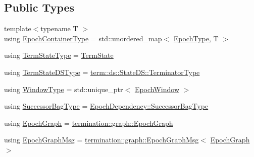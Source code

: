 \subsection*{Public Types}
\begin{DoxyCompactItemize}
\item 
{\footnotesize template$<$typename T $>$ }\\using \hyperlink{structvt_1_1term_1_1_termination_detector_a69e2615b61e072977463eea5b20b7933}{Epoch\+Container\+Type} = std\+::unordered\+\_\+map$<$ \hyperlink{namespacevt_a985a5adf291c34a3ca263b3378388236}{Epoch\+Type}, T $>$
\item 
using \hyperlink{structvt_1_1term_1_1_termination_detector_a0a47413bcb7bf5e10ecb31e7871a9268}{Term\+State\+Type} = \hyperlink{structvt_1_1term_1_1_term_state}{Term\+State}
\item 
using \hyperlink{structvt_1_1term_1_1_termination_detector_aa96c37b5c120063060c6418c48e64bd1}{Term\+State\+D\+S\+Type} = \hyperlink{structvt_1_1term_1_1ds_1_1_state_d_s_af98cfe31c25f710273ee103026d538e4}{term\+::ds\+::\+State\+D\+S\+::\+Terminator\+Type}
\item 
using \hyperlink{structvt_1_1term_1_1_termination_detector_a2c002273d9304c3cf72be85dd7d3ce52}{Window\+Type} = std\+::unique\+\_\+ptr$<$ \hyperlink{structvt_1_1term_1_1_epoch_window}{Epoch\+Window} $>$
\item 
using \hyperlink{structvt_1_1term_1_1_termination_detector_ac8df9c8a604ee2073ce195a994aaf252}{Successor\+Bag\+Type} = \hyperlink{structvt_1_1term_1_1_epoch_dependency_a3f00b47c33158f3241ebbeb0a0cb7b1d}{Epoch\+Dependency\+::\+Successor\+Bag\+Type}
\item 
using \hyperlink{structvt_1_1term_1_1_termination_detector_af67f0ab522e54eb06d8ac541526155e3}{Epoch\+Graph} = \hyperlink{structvt_1_1termination_1_1graph_1_1_epoch_graph}{termination\+::graph\+::\+Epoch\+Graph}
\item 
using \hyperlink{structvt_1_1term_1_1_termination_detector_aec8abc5a3b161ac7df73ff3ba385dace}{Epoch\+Graph\+Msg} = \hyperlink{structvt_1_1termination_1_1graph_1_1_epoch_graph_msg}{termination\+::graph\+::\+Epoch\+Graph\+Msg}$<$ \hyperlink{structvt_1_1term_1_1_termination_detector_af67f0ab522e54eb06d8ac541526155e3}{Epoch\+Graph} $>$
\end{DoxyCompactItemize}
